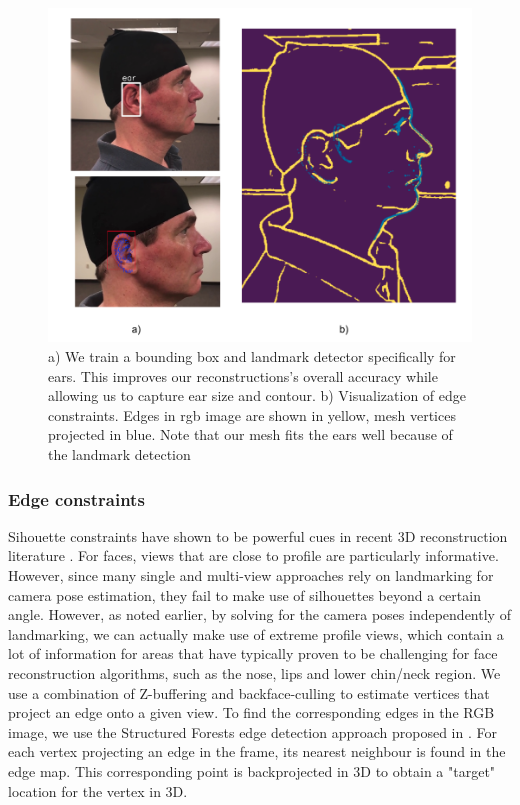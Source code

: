 \documentclass[10pt,twocolumn,letterpaper]{article}
\begin{document}
\begin{figure}[t]
\begin{center}
   \includegraphics[width=0.95\linewidth]{images/ear_lm_and_edges.png}
\end{center}
   \caption{ a) We train a bounding box and landmark detector specifically for ears. This improves our reconstructions's overall accuracy while allowing us to capture ear size and contour. b) Visualization of edge constraints. Edges in rgb image are shown in yellow, mesh vertices projected in blue. Note that our mesh fits the ears well because of the landmark detection }
\label{fig:ear_lm_and_edges}
\end{figure}






\subsubsection{Edge constraints}
Sihouette constraints have shown to be powerful cues in recent 3D reconstruction literature \cite{alldieck2018detailed,bas2016fitting}. For faces, views that are close to profile are particularly informative. However, since many single and multi-view approaches rely on landmarking for camera pose estimation, they fail to make use of silhouettes beyond a certain angle.
However, as noted earlier, by solving for the camera poses independently of landmarking, we can actually make use of extreme profile views, which contain a lot of information for  areas that have typically proven to be challenging for face reconstruction algorithms, such as the nose, lips and lower chin/neck region.
We use a combination of Z-buffering \cite{Foley1990ComputerG} and backface-culling  to estimate vertices that project an edge onto a given view. To find the corresponding edges in the RGB image, we use the Structured Forests edge detection approach proposed in \cite{dollar2013structured}. For each vertex projecting an edge in the frame, its nearest neighbour is found in the edge map. This corresponding point is backprojected in 3D to obtain a "target" location for the vertex in 3D.
\end{document}
